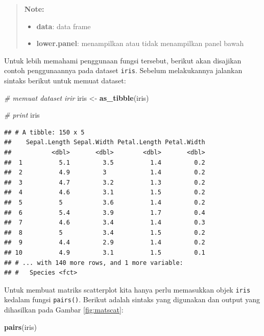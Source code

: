 \documentclass[]{book}
\newenvironment{Shaded}{\begin{snugshade}}{\end{snugshade}}
\newcommand{\KeywordTok}[1]{\textcolor[rgb]{0.13,0.29,0.53}{\textbf{#1}}}
\newcommand{\StringTok}[1]{\textcolor[rgb]{0.31,0.60,0.02}{#1}}
\newcommand{\CommentTok}[1]{\textcolor[rgb]{0.56,0.35,0.01}{\textit{#1}}}
\newcommand{\NormalTok}[1]{#1}
\providecommand{\tightlist}{%
  \setlength{\itemsep}{0pt}\setlength{\parskip}{0pt}}
\begin{document}
\begin{quote}
\textbf{Note: }

\begin{itemize}
\tightlist
\item
  \textbf{data}: data frame
\item
  \textbf{lower.panel}: menampilkan atau tidak menampilkan panel bawah
\end{itemize}
\end{quote}

Untuk lebih memahami penggunaan fungsi tersebut, berikut akan disajikan
contoh penggunaannya pada dataset \texttt{iris}. Sebelum melakukannya
jalankan sintaks berikut untuk memuat dataset:

\begin{Shaded}
\begin{Highlighting}[]
\CommentTok{# memuat dataset irir}
\NormalTok{iris <-}\StringTok{ }\KeywordTok{as_tibble}\NormalTok{(iris)}

\CommentTok{# print}
\NormalTok{iris}
\end{Highlighting}
\end{Shaded}

\begin{verbatim}
## # A tibble: 150 x 5
##    Sepal.Length Sepal.Width Petal.Length Petal.Width
##           <dbl>       <dbl>        <dbl>       <dbl>
##  1          5.1         3.5          1.4         0.2
##  2          4.9         3            1.4         0.2
##  3          4.7         3.2          1.3         0.2
##  4          4.6         3.1          1.5         0.2
##  5          5           3.6          1.4         0.2
##  6          5.4         3.9          1.7         0.4
##  7          4.6         3.4          1.4         0.3
##  8          5           3.4          1.5         0.2
##  9          4.4         2.9          1.4         0.2
## 10          4.9         3.1          1.5         0.1
## # ... with 140 more rows, and 1 more variable:
## #   Species <fct>
\end{verbatim}

Untuk membuat matriks scatterplot kita hanya perlu memasukkan objek
\texttt{iris} kedalam fungsi \texttt{pairs()}. Berikut adalah sintaks
yang digunakan dan output yang dihasilkan pada Gambar \ref{fig:matscat}:

\begin{Shaded}
\begin{Highlighting}[]
\KeywordTok{pairs}\NormalTok{(iris)}
\end{Highlighting}
\end{Shaded}
\end{document}
